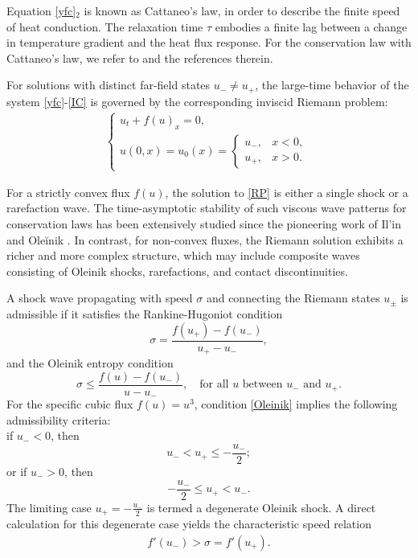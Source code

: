 \documentclass[10pt,reqno]{amsart}
\numberwithin{equation}{section}
\begin{document}
		Equation \eqref{yfc}$_2$ is known as Cattaneo's law, in order to describe the
		finite speed of heat conduction. The relaxation time $\tau$ embodies a finite lag between a change in temperature gradient and the heat flux response. For the conservation law with Cattaneo's law, we refer to \cite{ref8,ref3,ref5} and the references therein.
		
		For solutions with distinct far-field states $u_- \neq u_+$, the large-time behavior of the system \eqref{yfc}-\eqref{IC} is governed by the corresponding inviscid Riemann problem:
		\begin{align}\label{RP}
			\begin{cases}
				u_t + f(u)_x = 0, \\
				u(0, x) = u_0(x) = 
				\begin{cases}
					u_-, & x < 0, \\
					u_+, & x > 0.
				\end{cases}
			\end{cases}
		\end{align}
		
		For a strictly convex flux $f(u)$, the solution to \eqref{RP} is either a single shock or a rarefaction wave. The time-asymptotic stability of such viscous wave patterns for conservation laws has been extensively studied since the pioneering work of Il'in and Ole\u{i}nik \cite{ref9}. In contrast, for non-convex fluxes, the Riemann solution exhibits a richer and more complex structure, which may include composite waves consisting of Oleinik shocks, rarefactions, and contact discontinuities.
		
		A shock wave propagating with speed $\sigma$ and connecting the Riemann states $u_{\pm}$ is admissible if it satisfies the Rankine-Hugoniot condition
		\begin{equation}\label{RH}
			\sigma=\frac{f\left(u_{+}\right)-f\left(u_{-}\right)}{u_{+}-u_{-}},
		\end{equation}
		and the Oleinik entropy condition
		\begin{equation}\label{Oleinik}
			\sigma \leq \frac{f(u)-f\left(u_{-}\right)}{u-u_{-}}, \quad \text{for all } u \text{ between } u_{-} \text{ and } u_{+}.
		\end{equation}
		For the specific cubic flux $f(u) = u^3$, condition \eqref{Oleinik} implies the following admissibility criteria: \\if $u_{-} < 0$, then 
		$$u_{-}<u_{+}\leq -\frac{u_{-}}{2};$$
		or if $u_{-} > 0$, then 
		$$-\frac{u_{-}}{2} \leq u_{+}<u_{-}.$$ The limiting case $u_{+}=-\frac{u_{-}}{2}$ is termed a degenerate Oleinik shock. A direct calculation for this degenerate case yields the characteristic speed relation
		\begin{align}
			f'(u_{-}) > \sigma = f'(u_{+}).
		\end{align}
		
\end{document}
